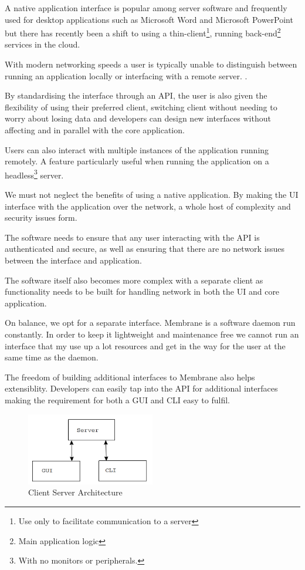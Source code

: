 \documentclass[11pt, a4paper, twoside]{report}
\begin{document}
A native application interface is popular among server software and frequently used for desktop applications such as Microsoft Word and Microsoft PowerPoint but there has recently been a shift to using a thin-client\footnote{Use only to facilitate communication to a server}, running back-end\footnote{Main application logic} services in the cloud.

With modern networking speeds a user is typically unable to distinguish between running an application locally or interfacing with a remote server. \citep{schmidt1999interactive}.

By standardising the interface through an API, the user is also given the flexibility of using their preferred client, switching client without needing to worry about losing data and developers can design new interfaces without affecting and in parallel with the core application.

Users can also interact with multiple instances of the application running remotely. A feature particularly useful when running the application on a headless\footnote{With no monitors or peripherals.} server.

We must not neglect the benefits of using a native application. By making the UI interface with the application over the network, a whole host of complexity and security issues form.

The software needs to ensure that any user interacting with the API is authenticated and secure, as well as ensuring that there are no network issues between the interface and application.

The software itself also becomes more complex with a separate client as functionality needs to be built for handling network in both the UI and core application.

On balance, we opt for a separate interface. Membrane is a software daemon run constantly. In order to keep it lightweight and maintenance free we cannot run an interface that my use up a lot resources and get in the way for the user at the same time as the daemon.

The freedom of building additional interfaces to Membrane also helps extensiblity. Developers can easily tap into the API for additional interfaces making the requirement for both a GUI and CLI easy to fulfil.

\begin{figure}[t]
 \centering
 \includegraphics[width=0.5\textwidth]{client-server-model}
 \caption{Client Server Architecture}
 \label{fig:client-server}
\end{figure}
\end{document}
